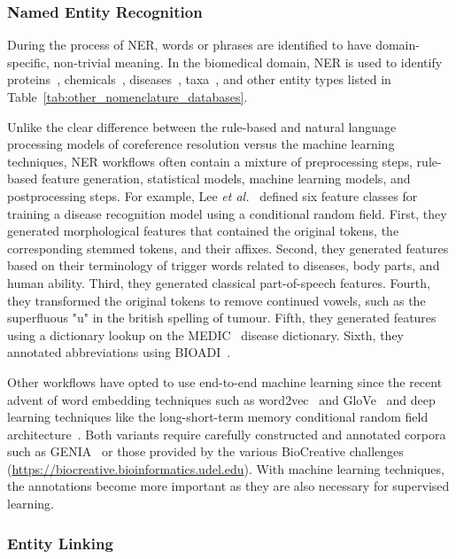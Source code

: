\subsubsection*{Named Entity Recognition}

During the process of \ac{NER}, words or phrases are identified to have domain-specific, non-trivial meaning.
In the biomedical domain, \ac{NER} is used to identify proteins~\cite{Hsu2008,Leaman2008, Hakenberg2011,Wei2015}, chemicals~\cite{Leaman2015,Corbett2018,Giorgi526244}, diseases~\cite{Leaman2013,Giorgi526244}, taxa~\cite{Gerner2010,Wei2012}, and other entity types listed in Table~\ref{tab:other_nomenclature_databases}.

Unlike the clear difference between the rule-based and natural language processing models of coreference resolution versus the machine learning techniques, \ac{NER} workflows often contain a mixture of preprocessing steps, rule-based feature generation, statistical models, machine learning models, and postprocessing steps.
For example, Lee \textit{et al.}~\cite{Lee2015} defined six feature classes for training a disease recognition model using a conditional random field.
First, they generated morphological features that contained the original tokens, the corresponding stemmed tokens, and their affixes.
Second, they generated features based on their terminology of trigger words related to diseases, body parts, and human ability.
Third, they generated classical part-of-speech features.
Fourth, they transformed the original tokens to remove continued vowels, such as the superfluous "u" in the british spelling of tumour.
Fifth, they generated features using a dictionary lookup on the MEDIC~\cite{Davis2012} disease dictionary.
Sixth, they annotated abbreviations using BIOADI~\cite{Kuo2009}.

Other workflows have opted to use end-to-end machine learning since the recent advent of word embedding techniques such as word2vec~\cite{Mikolov2013} and GloVe~\cite{Pennington2014} and deep learning techniques like the long-short-term memory conditional random field architecture~\cite{Lample2016}.
Both variants require carefully constructed and annotated corpora such as GENIA~\cite{Kim2003} or those provided by the various BioCreative challenges (\url{https://biocreative.bioinformatics.udel.edu}).
With machine learning techniques, the annotations become more important as they are also necessary for supervised learning.

\subsubsection*{Entity Linking}


